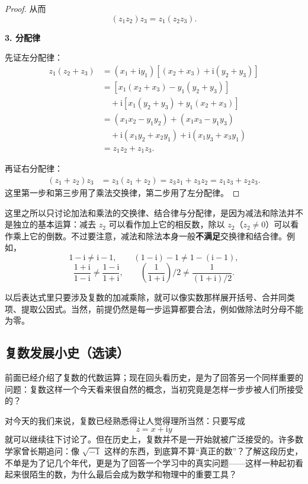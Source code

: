 \begin{proof}
从而
\[
    (z_1z_2)z_3=z_1(z_2z_3).
\]

\noindent\textbf{3. 分配律}

先证左分配律：
\begin{align*}
    z_1(z_2+z_3)
    &=(x_1+\mathrm{i}y_1)[(x_2+x_3)+\mathrm{i}(y_2+y_3)]\\
    &=[x_1(x_2+x_3)-y_1(y_2+y_3)]\\
    &\quad+\mathrm{i}[x_1(y_2+y_3)+y_1(x_2+x_3)]\\
    &=(x_1x_2-y_1y_2)+(x_1x_3-y_1y_3)\\
    &\quad+\mathrm{i}(x_1y_2+x_2y_1)+\mathrm{i}(x_1y_3+x_3y_1)\\
    &=z_1z_2+z_1z_3.
\end{align*}

再证右分配律：
\[
\begin{aligned}
    (z_1+z_2)z_3
    &=z_3(z_1+z_2)=z_3z_1+z_3z_2=z_1z_3+z_2z_3.
\end{aligned}
\]
这里第一步和第三步用了乘法交换律，第二步用了左分配律。
\end{proof}

\begin{zhu}{}{}
这里之所以只讨论加法和乘法的交换律、结合律与分配律，是因为减法和除法并不是独立的基本运算：减去 $z_2$ 可以看作加上它的相反数，除以 $z_2$（$z_2\neq 0$）可以看作乘上它的倒数。不过要注意，减法和除法本身一般\textbf{不满足}交换律和结合律。例如，
\[
1-\mathrm{i}\neq \mathrm{i}-1,\qquad (1-\mathrm{i})-1\neq 1-(\mathrm{i}-1),
\]
\[
\frac{1+\mathrm{i}}{1-\mathrm{i}}\neq \frac{1-\mathrm{i}}{1+\mathrm{i}},\qquad \left(\frac{1}{1+\mathrm{i}}\right)\Big/2\neq \frac{1}{(1+\mathrm{i})/2}.
\]
\end{zhu}

\begin{tishi}[复数运算的化简原则]
以后表达式里只要涉及复数的加减乘除，就可以像实数那样展开括号、合并同类项、提取公因式。当然，前提仍然是每一步运算都要合法，例如做除法时分母不能为零。
\end{tishi}

\subsection{复数发展小史（选读）}

前面已经介绍了复数的代数运算；现在回头看历史，是为了回答另一个同样重要的问题：复数这样一个今天看来很自然的概念，当初究竟是怎样一步步被人们所接受的？

对今天的我们来说，复数已经熟悉得让人觉得理所当然：只要写成
\[
z=x+\mathrm{i}y
\]
就可以继续往下讨论了。但在历史上，复数并不是一开始就被广泛接受的。许多数学家曾长期追问：像 $\sqrt{-1}$ 这样的东西，到底算不算``真正的数''？了解这段历史，不单是为了记几个年代，更是为了回答一个学习中的真实问题——这样一种起初看起来很陌生的数，为什么最后会成为数学和物理中的重要工具？


